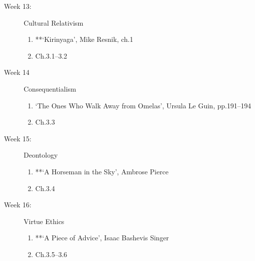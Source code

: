 \documentclass[article,oneside]{memoir}
\begin{document}
\begin{description}
\item[Week 13:] Cultural Relativism
\begin{enumerate}
\item **`Kirinyaga', Mike Resnik, ch.1
\item Ch.3.1--3.2
\end{enumerate}
\item[Week 14]  Consequentialism 
\begin{enumerate}
\item  `The Ones Who Walk Away from Omelas', Ursula Le Guin, pp.191--194 
\item Ch.3.3
\end{enumerate}
\item[Week 15:]  Deontology
\begin{enumerate}
\item **`A Horseman in the Sky', Ambrose Pierce
\item Ch.3.4

\end{enumerate}
\item[Week 16:] Virtue Ethics
\begin{enumerate}
\item **`A Piece of Advice', Isaac Bashevis Singer
\item Ch.3.5--3.6
\end{enumerate}



\end{description}
\end{document}
